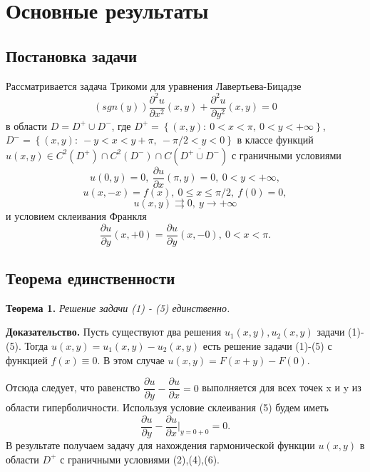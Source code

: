 \documentclass[12pt, a4paper]{article}
\begin{document}
\section{Основные результаты}
\subsection{Постановка задачи}
	Рассматривается задача Трикоми для уравнения Лавертьева-Бицадзе
\begin{equation}
	\left(sgn (y)\right) \dfrac{\partial^2 u}{\partial x^2}(x,y) + \dfrac{\partial^2 u}{\partial y^2}(x,y) = 0
\end{equation}
в области $D = D^{+} \cup D^{-}$, где $D^{+} = \left\{(x,y): \ 0 < x < \pi, \ 0 < y < + \infty \right\}$, \newline
$D^{-} = \left\{(x,y): \ -y < x < y + \pi, \ -\pi/2 < y < 0\right\}$ в классе функций $u(x,y) \in C^2(D^{+}) \cap C^2(D^{-}) \cap C(\overline{D^{+} \cup D^{-}})$ с граничными условиями
\begin{equation}
	u(0,y) = 0, \ \dfrac{\partial u}{\partial x}(\pi, y) = 0, \ 0 < y < + \infty,
\end{equation}
\begin{equation}
	u(x,-x) = f(x) , \ 0 \leq x \leq \pi/2, \ f(0) = 0, 
\end{equation}
\begin{equation}
	u(x,y) \rightrightarrows 0, \ y \to +\infty
\end{equation}
и условием склеивания Франкля 
\begin{equation}
 \dfrac{\partial u}{\partial y}(x, +0) = \dfrac{\partial u}{\partial y} (x, -0), \ 0 < x < \pi.
\end{equation}
\subsection{Теорема единственности}
\textbf{Теорема 1.} \textit{Решение задачи (1) - (5) единственно.}

\textbf{Доказательство.} 
Пусть существуют два решения $u_1(x,y), u_2(x,y)$ задачи (1)-(5). Тогда $u(x,y) = u_1(x,y) - u_2(x,y)$ есть решение задачи (1)-(5) с функцией $f(x) \equiv 0$. В этом случае $u(x,y) = F(x+y) - F(0)$.

Отсюда следует, что равенство $\dfrac{\partial u}{\partial y} - \dfrac{\partial u}{\partial x} = 0$ выполняется для всех точек x и y из области гиперболичности. Используя условие склеивания  (5) будем иметь
\begin{equation}
	\dfrac{\partial u}{\partial y} - \dfrac{\partial u}{\partial x}\vert_{y=0+0} = 0.
\end{equation}
В результате получаем задачу для нахождения гармонической функции $u(x,y)$ в области $D^{+}$ с граничными условиями (2),(4),(6).
\end{document}
